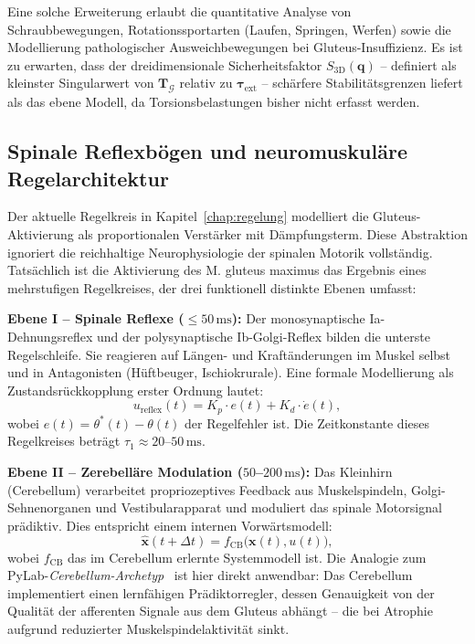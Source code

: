 ﻿\documentclass[12pt,a4paper]{report}
\theoremstyle{plain}
\theoremstyle{definition}
\theoremstyle{remark}
\begin{document}
	Eine solche Erweiterung erlaubt die quantitative Analyse von Schraubbewegungen,
	Rotationssportarten (Laufen, Springen, Werfen) sowie die Modellierung
	pathologischer Ausweichbewegungen bei Gluteus-Insuffizienz.
	Es ist zu erwarten, dass der dreidimensionale Sicherheitsfaktor
	$S_{\mathrm{3D}}(\mathbf{q})$ -- definiert als kleinster Singularwert von
	$\mathbf{T}_\mathcal{G}$ relativ zu $\boldsymbol{\tau}_{\mathrm{ext}}$ --
	schärfere Stabilitätsgrenzen liefert als das ebene Modell, da
	Torsionsbelastungen bisher nicht erfasst werden.
	
	\subsection{Spinale Reflexbögen und neuromuskuläre Regelarchitektur}
	\label{subsec:reflexe}
	
	Der aktuelle Regelkreis in Kapitel~\ref{chap:regelung} modelliert die
	Gluteus-Aktivierung als proportionalen Verstärker mit Dämpfungsterm.
	Diese Abstraktion ignoriert die reichhaltige Neurophysiologie der
	spinalen Motorik vollständig. Tatsächlich ist die Aktivierung des
	M. gluteus maximus das Ergebnis eines mehrstufigen Regelkreises,
	der drei funktionell distinkte Ebenen umfasst:
	
	\textbf{Ebene I -- Spinale Reflexe ($\leq 50\,\mathrm{ms}$):}
	Der monosynaptische Ia-Dehnungsreflex und der polysynaptische
	Ib-Golgi-Reflex bilden die unterste Regelschleife. Sie reagieren
	auf Längen- und Kraftänderungen im Muskel selbst und in
	Antagonisten (Hüftbeuger, Ischiokrurale). Eine formale Modellierung
	als Zustandsrückkopplung erster Ordnung lautet:
	\[
	u_{\mathrm{reflex}}(t) = K_p \cdot e(t) + K_d \cdot \dot{e}(t),
	\]
	wobei $e(t) = \theta^*(t) - \theta(t)$ der Regelfehler ist.
	Die Zeitkonstante dieses Regelkreises beträgt $\tau_1 \approx 20$--$50\,\mathrm{ms}$.
	
	\textbf{Ebene II -- Zerebelläre Modulation ($50$--$200\,\mathrm{ms}$):}
	Das Kleinhirn (Cerebellum) verarbeitet propriozeptives Feedback aus
	Muskelspindeln, Golgi-Sehnenorganen und Vestibularapparat und
	moduliert das spinale Motorsignal prädiktiv. Dies entspricht
	einem internen Vorwärtsmodell:
	\[
	\hat{\mathbf{x}}(t+\Delta t) = f_{\mathrm{CB}}\bigl(\mathbf{x}(t), u(t)\bigr),
	\]
	wobei $f_{\mathrm{CB}}$ das im Cerebellum erlernte Systemmodell ist.
	Die Analogie zum PyLab-\emph{Cerebellum-Archetyp}~\cite{epp2026wolke}
	ist hier direkt anwendbar: Das Cerebellum implementiert einen
	lernfähigen Prädiktorregler, dessen Genauigkeit von der Qualität
	der afferenten Signale aus dem Gluteus abhängt -- die bei Atrophie
	aufgrund reduzierter Muskelspindelaktivität sinkt.
	
\end{document}
